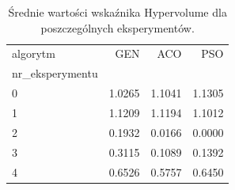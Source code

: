 \begin{table}
\caption{Średnie wartości wskaźnika Hypervolume dla poszczególnych eksperymentów.}
\label{tab:hv_srednie}
\begin{tabular}{lrrr}
\toprule
algorytm & GEN & ACO & PSO \\
nr_eksperymentu &  &  &  \\
\midrule
0 & 1.0265 & 1.1041 & 1.1305 \\
1 & 1.1209 & 1.1194 & 1.1012 \\
2 & 0.1932 & 0.0166 & 0.0000 \\
3 & 0.3115 & 0.1089 & 0.1392 \\
4 & 0.6526 & 0.5757 & 0.6450 \\
\bottomrule
\end{tabular}
\end{table}
